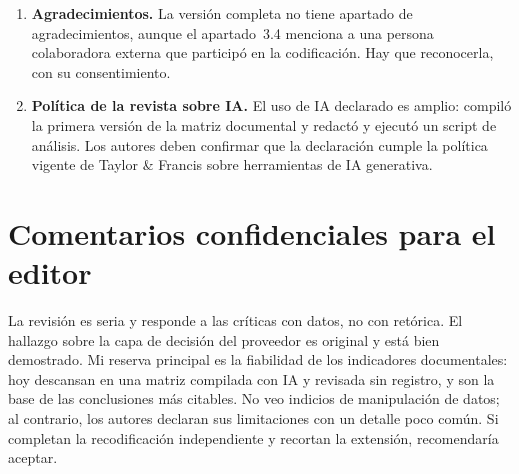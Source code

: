 \documentclass[11pt,a4paper]{article}
\begin{document}
\begin{enumerate}
	\item \textbf{Agradecimientos.} La versi\'on completa no tiene apartado de agradecimientos, aunque el apartado~3.4 menciona a una persona colaboradora externa que particip\'o en la codificaci\'on. Hay que reconocerla, con su consentimiento.
	\item \textbf{Pol\'itica de la revista sobre IA.} El uso de IA declarado es amplio: compil\'o la primera versi\'on de la matriz documental y redact\'o y ejecut\'o un script de an\'alisis. Los autores deben confirmar que la declaraci\'on cumple la pol\'itica vigente de Taylor \& Francis sobre herramientas de IA generativa.
\end{enumerate}

\section{Comentarios confidenciales para el editor}

La revisi\'on es seria y responde a las cr\'iticas con datos, no con ret\'orica. El hallazgo sobre la capa de decisi\'on del proveedor es original y est\'a bien demostrado. Mi reserva principal es la fiabilidad de los indicadores documentales: hoy descansan en una matriz compilada con IA y revisada sin registro, y son la base de las conclusiones m\'as citables. No veo indicios de manipulaci\'on de datos; al contrario, los autores declaran sus limitaciones con un detalle poco com\'un. Si completan la recodificaci\'on independiente y recortan la extensi\'on, recomendar\'ia aceptar.
\end{document}
